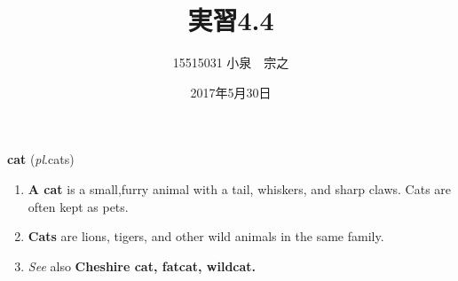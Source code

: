 \documentclass[12pt,a4j]{jarticle}
\title{実習4.4}
\author{15515031 小泉　宗之}
\date{2017年5月30日}
\begin{document}
\maketitle
\textbf{cat} (\textit{pl}.cats)
\begin{enumerate}
\item          \textbf{A cat} is a small,furry animal with a tail, whiskers, and sharp claws. Cats are often kept as pets.
\item          \textbf{Cats} are lions, tigers, and other wild animals in the same family.
\item          \textit{See} also \textbf{Cheshire cat, fatcat, wildcat.}
\end{enumerate}
\end{document}
